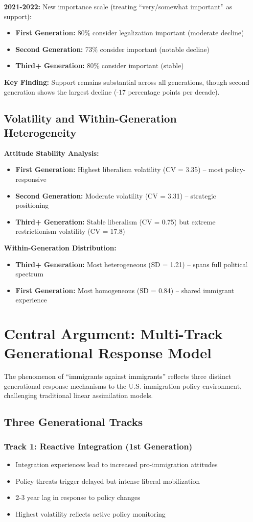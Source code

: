 \documentclass[11pt,letterpaper]{article}
\newcommand{\compactdesc}[2]{\item \textbf{#1:} #2}
\begin{document}
\textbf{2021-2022:} New importance scale (treating ``very/somewhat important'' as support):
\begin{itemize}
    \compactdesc{First Generation}{80\% consider legalization important (moderate decline)}
    \compactdesc{Second Generation}{73\% consider important (notable decline)}
    \compactdesc{Third+ Generation}{80\% consider important (stable)}
\end{itemize}

\textbf{Key Finding:} Support remains substantial across all generations, though second generation shows the largest decline (-17 percentage points per decade).

\subsection{Volatility and Within-Generation Heterogeneity}

\textbf{Attitude Stability Analysis:}
\begin{itemize}
    \compactdesc{First Generation}{Highest liberalism volatility (CV = 3.35) -- most policy-responsive}
    \compactdesc{Second Generation}{Moderate volatility (CV = 3.31) -- strategic positioning}
    \compactdesc{Third+ Generation}{Stable liberalism (CV = 0.75) but extreme restrictionism volatility (CV = 17.8)}
\end{itemize}

\textbf{Within-Generation Distribution:}
\begin{itemize}
    \compactdesc{Third+ Generation}{Most heterogeneous (SD = 1.21) -- spans full political spectrum}
    \compactdesc{First Generation}{Most homogeneous (SD = 0.84) -- shared immigrant experience}
\end{itemize}

\section{Central Argument: Multi-Track Generational Response Model}

The phenomenon of ``immigrants against immigrants'' reflects three distinct generational response mechanisms to the U.S. immigration policy environment, challenging traditional linear assimilation models.

\subsection{Three Generational Tracks}

\subsubsection{Track 1: Reactive Integration (1st Generation)}
\begin{itemize}
    \item Integration experiences lead to increased pro-immigration attitudes
    \item Policy threats trigger delayed but intense liberal mobilization
    \item 2-3 year lag in response to policy changes
    \item Highest volatility reflects active policy monitoring
\end{itemize}
\end{document}
